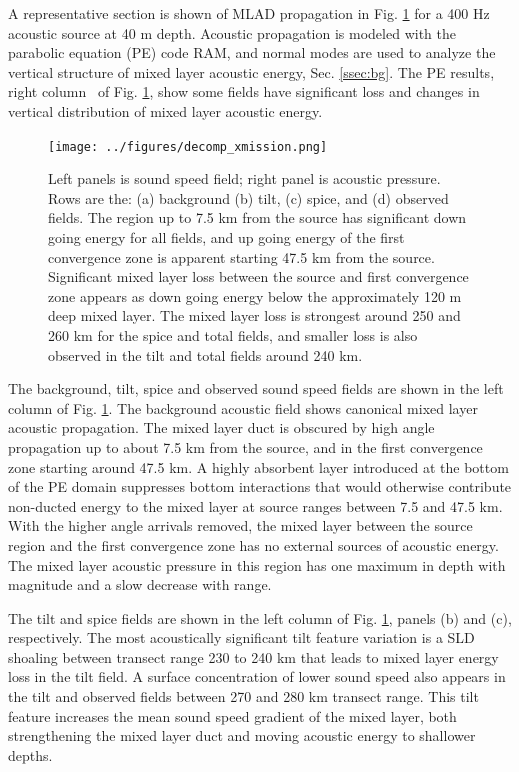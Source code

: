 \documentclass[preprint,NumberedRefs]{JASA}
\begin{document}
A representative section is shown of MLAD propagation in Fig. \ref{fig:decomp_x} for a 400 Hz acoustic source at 40 m depth. Acoustic propagation is modeled with the parabolic equation (PE) code RAM\citep{collins93}, and normal modes are used to analyze the vertical structure of mixed layer acoustic energy, Sec. \ref{ssec:bg}. The PE results, right column  of Fig. \ref{fig:decomp_x}, show some fields have significant loss and changes in vertical distribution of mixed layer acoustic energy.

\begin{figure}
\texttt{[image: ../figures/decomp\_xmission.png]}
    \caption{\label{fig:decomp_x}{Left panels is sound speed field; right panel is acoustic pressure. Rows are the: (a) background (b) tilt, (c) spice, and (d) observed fields. The region up to 7.5 km from the source has significant down going energy for all fields, and up going energy of the first convergence zone is apparent starting 47.5 km from the source. Significant mixed layer loss between the source and first convergence zone appears as down going energy below the approximately 120 m deep mixed layer. The mixed layer loss is strongest around 250 and 260 km for the spice and total fields, and smaller loss is also observed in the tilt and total fields around 240 km.}}
\end{figure}

The background, tilt, spice and observed sound speed fields are shown in the left column of Fig. \ref{fig:decomp_x}. The background acoustic field shows canonical mixed layer acoustic propagation. The mixed layer duct is obscured by high angle propagation up to about 7.5 km from the source, and in the first convergence zone starting around 47.5 km. A highly absorbent layer introduced at the bottom of the PE domain suppresses bottom interactions that would otherwise contribute non-ducted energy to the mixed layer at source ranges between 7.5 and 47.5 km. With the higher angle arrivals removed, the mixed layer between the source region and the first convergence zone has no external sources of acoustic energy. The mixed layer acoustic pressure in this region has one maximum in depth with magnitude and a slow decrease with range.

The tilt and spice fields are shown in the left column of Fig. \ref{fig:decomp_x}, panels (b) and (c), respectively. The most acoustically significant tilt feature variation is a SLD shoaling between transect range 230 to 240 km that leads to mixed layer energy loss in the tilt field. A surface concentration of lower sound speed also appears in the tilt and observed fields between 270 and 280 km transect range. This tilt feature increases the mean sound speed gradient of the mixed layer, both strengthening the mixed layer duct and moving acoustic energy to shallower depths.
\end{document}
